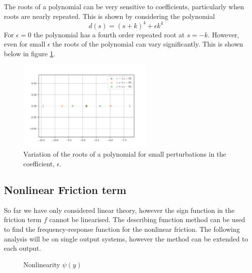 \documentclass{article}
\begin{document}
The roots of a polynomial can be very sensitive to coefficients, particularly when roots are nearly repeated.
This is shown by considering the polynomial
\begin{equation}
  d(s) = (s+k)^4 + \epsilon k^4
\end{equation}
For $\epsilon = 0$ the polynomial has a fourth order repeated root at $s = -k$.
However, even for small $\epsilon$ the roots of the polynomial can vary significantly. This is shown below in figure \ref{fig:pole_sensitivity}.

\begin{figure}[H]
  \centering
  \includegraphics[width=0.6\textwidth]{figures/pole_sensitivity.png}
  \caption{Variation of the roots of a polynomial for small perturbations in the coefficient, $\epsilon$.}
  \label{fig:pole_sensitivity}
\end{figure}

\subsection{Nonlinear Friction term}
So far we have only considered linear theory, however the sign function in the friction term $f$ cannot be linearised.
The describing function method can be used to find the frequency-response function for
the nonlinear friction.
The following analysis will be on single output systems, however the method can be extended to each output.

\begin{figure}[H]
  \centering
  \caption{Nonlinearity $\psi(y)$ }
  \label{fig:nonlinear_block_diagram}
\end{figure}
\end{document}
